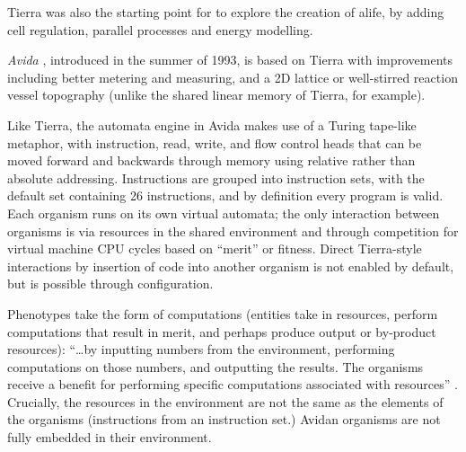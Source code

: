 Tierra was also the starting point for \textcite{Taylor:1999sc, Taylor2001} to explore the creation of \gls{alife}, by adding cell regulation, parallel processes and energy modelling.


\emph{Avida} \parencite{Ofria2004}, introduced in the summer of 1993, is based on Tierra with improvements including better metering and measuring, and a 2D lattice or well-stirred reaction vessel topography (unlike the shared linear memory of Tierra, for example).

Like Tierra, the automata engine in Avida makes use of a Turing tape-like metaphor, with instruction, read, write, and flow control heads that can be moved forward and backwards through memory using relative rather than absolute addressing. Instructions are grouped into instruction sets, with the default set containing 26 instructions, and by definition every program is valid. Each organism runs on its own virtual automata; the only interaction between organisms is via resources in the shared environment and through competition for virtual machine CPU cycles based on ``merit'' or fitness. Direct Tierra-style interactions by insertion of code into another organism is not enabled by default, but is possible through configuration. 

Phenotypes take the form of computations (entities take in resources, perform computations that result in merit, and perhaps produce output or by-product resources): ``\ldots by inputting numbers from the environment, performing computations on those numbers, and outputting the results. The organisms receive a benefit for performing specific computations associated with resources'' \parencite{Ofria2004}. Crucially, the resources in the environment are not the same as the elements of the organisms (instructions from an instruction set.) Avidan organisms are not fully embedded in their environment.

